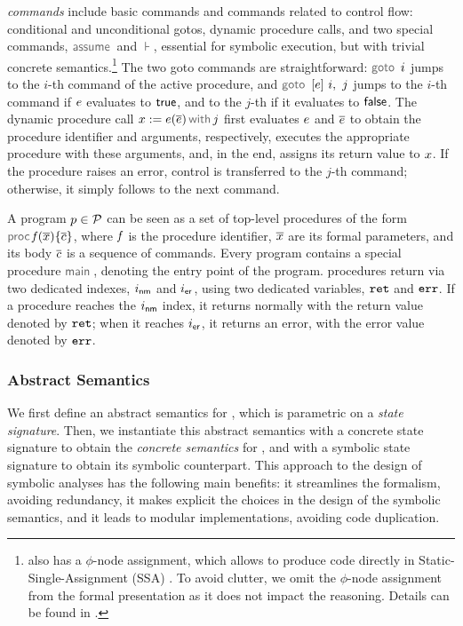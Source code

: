 \jsil \emph{commands} include \jsil basic commands and commands related to control flow: conditional and unconditional gotos, dynamic procedure calls, and two special commands, $\assume$ and $\assert$, essential for symbolic execution, but with trivial concrete semantics.\footnote{\jsil also has a $\phi$-node assignment, which allows \JSComp to produce code directly in Static-Single-Assignment (SSA) \cite{SSA}. To avoid clutter, we omit the $\phi$-node assignment from the formal presentation as it does not impact the reasoning. Details can be found in \cite{javert}.} 
The two goto commands are straightforward: $\goto \ i$ jumps to the $i$-th command of the active procedure, and $\ifgoto{\jsilexpr}{i}{j}$ jumps to the $i$-th command if $e$ evaluates to ${\sf true}$, and to the $j$-th if it evaluates to ${\sf false}$. 
The dynamic procedure call $\jsilcall{\jvar}{\jsilexpr}{\jvec{\jsilexpr}}{j}$ first evaluates  $e$ and $\overline{e}$ to obtain the procedure identifier and arguments, respectively, executes the appropriate procedure with these arguments, and, in the end, assigns its return value to $x$.
If the procedure raises an error, control is transferred to the $j$-th command; otherwise, it simply follows to the next command. 

A \jsil program $p \in \mathcal{P}$ can be seen as a set of top-level procedures of the form $\procedure{\pid}{\jvec{\jvar}}{\jvec{\jcmd}}$, where $\mathit{f}$ is the procedure identifier, $\overline{x}$ are its formal parameters, and its body ${\overline{c}}$  is a sequence of \jsil commands.
Every \jsil program contains a special procedure $\jsilmain$\hspace{-2pt}, denoting the entry point of the program. 
\jsil procedures return via two dedicated indexes, $i_{{\sf nm}}$ and $i_{{\sf er}}$, using two dedicated variables, $\mathtt{ret}$ and $\mathtt{err}$. If a procedure reaches the $i_{{\sf nm}}$ index, it returns normally with the return value denoted by $\mathtt{ret}$; when it reaches $i_{{\sf er}}$, it returns an error, with the error value denoted by $\mathtt{err}$.

%

\subsubsection{Abstract Semantics}
We first define an abstract semantics for \jsil, which is parametric on a \jsil \emph{state signature}. 
Then, we instantiate this abstract semantics with a concrete state signature to obtain the \emph{concrete semantics} for \jsil, and with a symbolic state signature to obtain its symbolic counterpart.
This approach to the design of symbolic analyses has the following main benefits:  it streamlines the formalism, avoiding redundancy,
 it makes explicit the choices in the design of the symbolic semantics,
and  it leads to modular implementations, avoiding code duplication.


